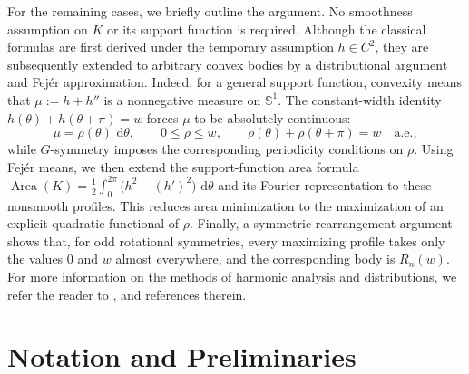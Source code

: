 \documentclass[11pt,letterpaper,reqno]{amsart}
\newcommand{\dd}{\,\mathrm{d}}
\begin{document}
For the remaining cases, we briefly outline the argument. No smoothness
assumption on $K$ or its support function is required. Although the
classical formulas are first derived under the temporary assumption
$h\in C^2$, they are subsequently extended to arbitrary convex bodies
by a distributional argument and Fejér approximation. Indeed, for a
general support function, convexity means that
\(
\mu:=h+h''
\)
is a nonnegative measure on $\mathbb S^1$. The constant-width identity
$h(\theta)+h(\theta+\pi)=w$ forces $\mu$ to be absolutely continuous:
\[
\mu=\rho(\theta)\,\dd\theta,
\qquad
0\leq\rho\leq w,
\qquad
\rho(\theta)+\rho(\theta+\pi)=w
\quad\text{a.e.},
\]
while $G$-symmetry imposes the corresponding periodicity conditions on
$\rho$. Using Fejér means, we then extend the support-function area
formula
\(
\operatorname{Area}(K)
=
\frac12\int_0^{2\pi}
\bigl(h^2-(h')^2\bigr)\,\dd\theta
\)
and its Fourier representation to these nonsmooth profiles. This
reduces area minimization to the maximization of an explicit quadratic
functional of $\rho$. Finally, a symmetric rearrangement argument shows
that, for odd rotational symmetries, every maximizing profile takes only
the values $0$ and $w$ almost everywhere, and the corresponding body is $R_n(w)$. For more information on the methods of harmonic analysis and distributions, we refer the reader to \cite{Edwards1}, \cite{Edwards2} and references therein.

\section{Notation and Preliminaries}
\end{document}
